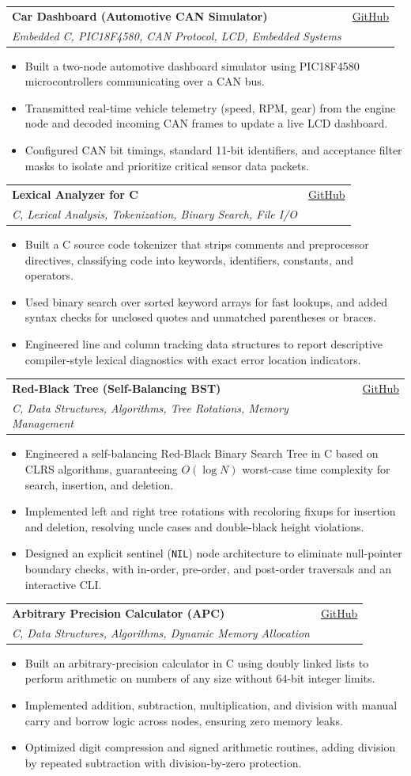 \documentclass[letterpaper,11pt]{article}
\makeatletter
\newcommand{\resumeItem}[1]{
  \item
    {#1 \vspace{-3pt}}
}
\newcommand{\resumeSubheading}[4]{
  \vspace{-2pt}\item
    \begin{tabular*}{0.97\textwidth}[t]{l@{\extracolsep{\fill}}r}
      \textbf{#1} & #2 \\
      \textit{#3} & {#4} \\
    \end{tabular*}\vspace{-7pt}
}
\newcommand{\resumeItemListStart}{\begin{itemize}[topsep=2pt, itemsep=1pt, parsep=0pt]}
\newcommand{\resumeItemListEnd}{\end{itemize}\vspace{-6pt}}
\makeatother
\begin{document}
  \newpage

    \resumeSubheading
      {Car Dashboard (Automotive CAN Simulator)}{\href{https://github.com/k0-R0/Car_Dashboard}{GitHub}}
      {Embedded C, PIC18F4580, CAN Protocol, LCD, Embedded Systems}{}
      \resumeItemListStart
        \resumeItem{Built a two-node automotive dashboard simulator using PIC18F4580 microcontrollers communicating over a CAN bus.}
        \resumeItem{Transmitted real-time vehicle telemetry (speed, RPM, gear) from the engine node and decoded incoming CAN frames to update a live LCD dashboard.}
        \resumeItem{Configured CAN bit timings, standard 11-bit identifiers, and acceptance filter masks to isolate and prioritize critical sensor data packets.}
      \resumeItemListEnd

    \resumeSubheading
      {Lexical Analyzer for C}{\href{https://github.com/k0-R0/Lexical-Analyzer}{GitHub}}
      {C, Lexical Analysis, Tokenization, Binary Search, File I/O}{}
      \resumeItemListStart
        \resumeItem{Built a C source code tokenizer that strips comments and preprocessor directives, classifying code into keywords, identifiers, constants, and operators.}
        \resumeItem{Used binary search over sorted keyword arrays for fast lookups, and added syntax checks for unclosed quotes and unmatched parentheses or braces.}
        \resumeItem{Engineered line and column tracking data structures to report descriptive compiler-style lexical diagnostics with exact error location indicators.}
      \resumeItemListEnd

    \resumeSubheading
      {Red-Black Tree (Self-Balancing BST)}{\href{https://github.com/k0-R0/RedBlack_Tree}{GitHub}}
      {C, Data Structures, Algorithms, Tree Rotations, Memory Management}{}
      \resumeItemListStart
        \resumeItem{Engineered a self-balancing Red-Black Binary Search Tree in C based on CLRS algorithms, guaranteeing $O(\log N)$ worst-case time complexity for search, insertion, and deletion.}
        \resumeItem{Implemented left and right tree rotations with recoloring fixups for insertion and deletion, resolving uncle cases and double-black height violations.}
        \resumeItem{Designed an explicit sentinel (\texttt{NIL}) node architecture to eliminate null-pointer boundary checks, with in-order, pre-order, and post-order traversals and an interactive CLI.}
      \resumeItemListEnd

    \resumeSubheading
      {Arbitrary Precision Calculator (APC)}{\href{https://github.com/k0-R0/APC}{GitHub}}
      {C, Data Structures, Algorithms, Dynamic Memory Allocation}{}
      \resumeItemListStart
        \resumeItem{Built an arbitrary-precision calculator in C using doubly linked lists to perform arithmetic on numbers of any size without 64-bit integer limits.}
        \resumeItem{Implemented addition, subtraction, multiplication, and division with manual carry and borrow logic across nodes, ensuring zero memory leaks.}
        \resumeItem{Optimized digit compression and signed arithmetic routines, adding division by repeated subtraction with division-by-zero protection.}
      \resumeItemListEnd
\end{document}
